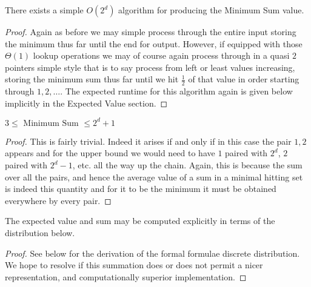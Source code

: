 \documentclass[12pt]{article}
\begin{document}
\begin{theorem}\label{Thm:$n = 2$ Minimum Sum Algorithm}
	There exists a simple $O(2^d)$ algorithm for producing the Minimum Sum value.
\end{theorem}

\begin{proof}
	Again as before we may simple process through the entire input storing the minimum thus far until the end for output. However, if equipped with those $\Theta(1)$ lookup operations we may of course again process through in a quasi $2$ pointers simple style that is to say process from left or least values increasing, storing the minimum sum thus far until we hit $\frac{1}{2}$ of that value in order starting through $1,2,\dots$. The expected runtime for this algorithm again is given below implicitly in the Expected Value section.
\end{proof}

\begin{theorem}\label{Thm:$n = 2$ Minimum Sum Bounds}
	$3 \le \text{ Minimum Sum } \le 2^{d}+1$
\end{theorem}

\begin{proof}
	This is fairly trivial. Indeed it arises if and only if in this case the pair $1,2$ appears and for the upper bound we would need to have $1$ paired with $2^d$, $2$ paired with $2^d - 1$, etc. all the way up the chain. Again, this is because the sum over all the pairs, and hence the average value of a sum in a minimal hitting set is indeed this quantity and for it to be the minimum it must be obtained everywhere by every pair.
\end{proof}

\begin{theorem}\label{Thm:$n = 2$ Minimum Sum Expected Value And Sum}
	The expected value and sum may be computed explicitly in terms of the distribution below.
\end{theorem}

\begin{proof}
	See below for the derivation of the formal formulae discrete distribution. We hope to resolve if this summation does or does not permit a nicer representation, and computationally superior implementation.
\end{proof}

\end{document}
